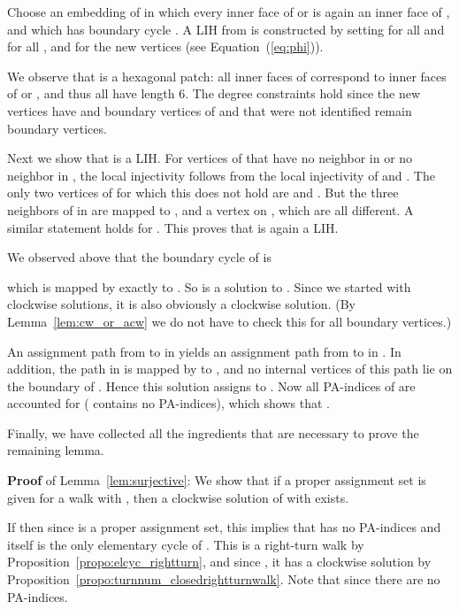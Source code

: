 \documentclass{llncs}
\newcommand{\QED}{\hspace*{\fill}{}\medskip}
\begin{document}
Choose an embedding of  in which every inner face of  or  is again an inner face of , and which has boundary cycle .
A LIH  from  is constructed by setting  for all  and  for all , and  for the new vertices (see Equation~(\ref{eq:phi})).




We observe that  is a hexagonal patch: 
all inner faces of  correspond to inner faces of  or , and thus all have length 6. The degree constraints hold since the new vertices  have  and boundary vertices of  and  that were not identified remain boundary vertices.



Next we show that  is a LIH. For vertices of  that have no neighbor in  or no neighbor in , the local injectivity follows from the local injectivity of  and . 
The only two vertices of  for which this does not hold are  and . But the three neighbors of  in  are mapped to ,  and a vertex on , which are all different. A similar statement holds for . This proves that  is again a LIH.


 
We observed above that the boundary cycle of  is 
 
which is mapped by  exactly to . 
So  is a solution to . Since we started with clockwise solutions, it is also obviously a clockwise solution.
(By Lemma~\ref{lem:cw_or_acw} we do not have to check this for all boundary vertices.)



	
An assignment path from  to  in  yields an assignment path from  to  in .
In addition, the path  in  is mapped by  to , and no internal vertices of this path lie on the boundary of . Hence this solution assigns  to . Now all PA-indices of  are accounted for ( contains no PA-indices), which shows that 
.
\QED






Finally, we have collected all the ingredients that are necessary to prove the remaining lemma.

\medskip


{\bf Proof} of Lemma~\ref{lem:surjective}:
We show that if a proper assignment set  is given for a walk  with , then a clockwise solution  of  with  exists.

If  then since  is a proper assignment set, this implies that  has no PA-indices and  itself is the only elementary cycle of . 
This is a right-turn walk by Proposition~\ref{propo:elcyc_rightturn}, and since , it has a clockwise solution  by Proposition~\ref{propo:turnnum_closedrightturnwalk}. Note that  since there are no PA-indices.
\end{document}
